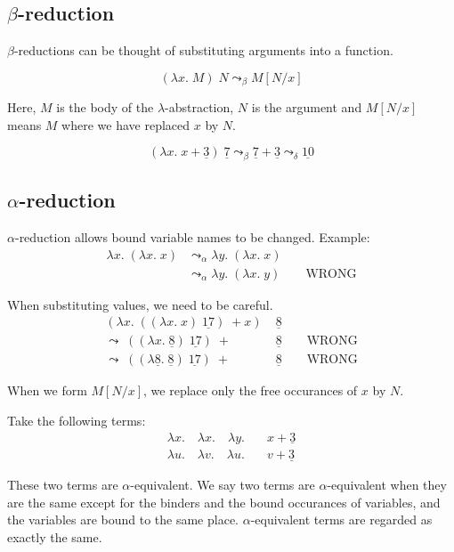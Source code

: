 \documentclass[11pt]{article}
\begin{document}
	\subsection{$\beta$-reduction}
	$\beta$-reductions can be thought of substituting arguments into a function.
	
	\[(\lambda x . \; M) \; N \leadsto_{\beta} M[N/x] \]
	
	Here, $M$ is the body of the $\lambda$-abstraction, $N$ is the argument and $M[N/x]$ means $M$ where we have replaced $x$ by $N$.
	
	\[(\lambda x . \; x + \underline{3}) \; \underline{7} \leadsto_{\beta} \underline{7} + \underline{3} \leadsto_{\delta} \underline{10} \]
	\subsection{$\alpha$-reduction}	
	$\alpha$-reduction allows bound variable names to be changed. Example:
	\begin{align*}
	\lambda x . \; (\lambda x . \; x) &\leadsto_{\alpha} \lambda y . \; (\lambda x . \; x) \\
	 &\leadsto_{\alpha} \lambda y . \; (\lambda x . \; y) \qquad \text{WRONG}
	\end{align*}
	
	When substituting values, we need to be careful. 
	\begin{align*}
	(\lambda x . \; ((\lambda x . \; x) \; \underline{17}) \; + x) \; &\underline{8} \\
	\leadsto \; ((\lambda x . \; \underline{8}) \; \underline{17}) \; + &\underline{8} \qquad \text{WRONG} \\
	\leadsto \; ((\lambda \underline{8} . \; \underline{8}) \; \underline{17} ) \; + &\underline{8} \qquad \text{WRONG}
	\end{align*}
	
	When we form $M[N/x]$, we replace only the free occurances of $x$ by $N$.
	
	Take the following terms:
	\begin{align*}
		\lambda x .\quad \lambda x.\quad \lambda y .\quad &x + \underline{3} \\
		\lambda u . \quad \lambda v. \quad \lambda u . \quad &v + \underline{3}
	\end{align*}

	These two terms are $\alpha$-equivalent. We say two terms are $\alpha$-equivalent when they are the same except for the binders and the bound occurances of variables, and the variables are bound to the same place. $\alpha$-equivalent terms are regarded as exactly the same.
	
\end{document}
